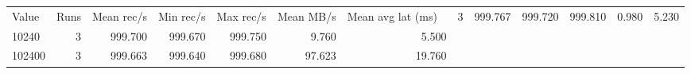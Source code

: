 \begin{tabular}{lrrrrrr}
\hline
Value & Runs & Mean rec/s & Min rec/s & Max rec/s & Mean MB/s & Mean avg lat (ms) \
 & 3 & 999.767 & 999.720 & 999.810 & 0.980 & 5.230 \\
10240 & 3 & 999.700 & 999.670 & 999.750 & 9.760 & 5.500 \\
102400 & 3 & 999.663 & 999.640 & 999.680 & 97.623 & 19.760 \\
\hline
\end{tabular}
